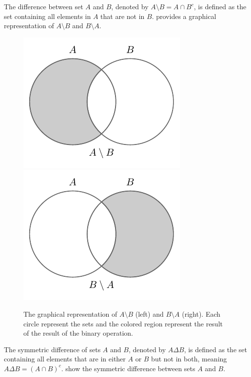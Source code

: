 \begin{definition}[Difference]
	The difference between set $A$ and $B$, denoted by $A \setminus B = A\cap B^c$, is defined as the set containing all elements in $A$ that are not in $B$.  provides a graphical representation of $A\setminus B$ and $B\setminus A$.
	\begin{figure}[H]
		\centering
		\includegraphics[]{figures/set_minus.pdf}
		\includegraphics[]{figures/set_minus2.pdf}
		\caption{The graphical representation of $A\setminus B$ (left) and $B\setminus A$ (right). Each circle represent the sets and the colored region represent the result of the result of the binary operation.}
		\label{fig:set_minus}
	\end{figure}
\end{definition}

\newpage
\begin{definition}
	The symmetric difference of sets $A$ and $B$, denoted by $A \Delta B$, is defined as the set containing all elements that are in either $A$ or $B$ but not in both, meaning $A \Delta B = (A \cap B)^c$.  show the symmetric difference between sets $A$ and $B$.
\end{definition}



